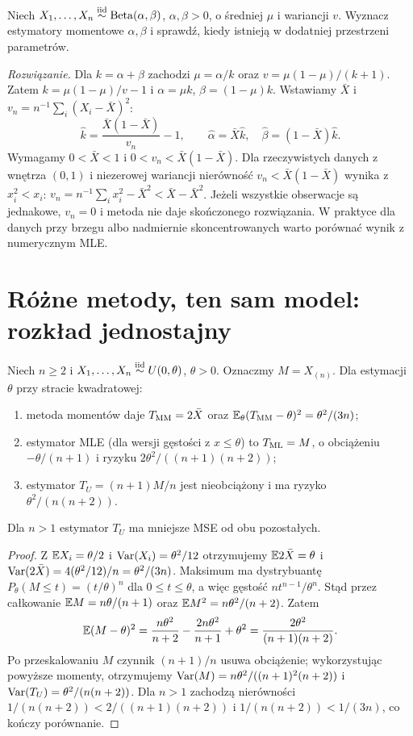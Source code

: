 \begin{zadanie}
\label{zad:beta-mom}
Niech $X_1,\ldots,X_n\mathrel{\overset{\mathrm{iid}}\sim}\operatorname{Beta}(\alpha,\beta)$,
$\alpha,\beta>0$, o średniej $\mu$ i wariancji $v$.
Wyznacz estymatory momentowe $\alpha,\beta$ i sprawdź,
kiedy istnieją w dodatniej przestrzeni parametrów.
\par\emph{Rozwiązanie.} Dla $k=\alpha+\beta$ zachodzi
$\mu=\alpha/k$ oraz $v=\mu(1-\mu)/(k+1)$. Zatem
$k=\mu(1-\mu)/v-1$ i $\alpha=\mu k$, $\beta=(1-\mu)k$.
Wstawiamy $\bar X$ i $v_n=n^{-1}\sum_i(X_i-\bar X)^2$:
\[
\widehat k=\frac{\bar X(1-\bar X)}{v_n}-1,\qquad
\widehat\alpha=\bar X\widehat k,\quad
\widehat\beta=(1-\bar X)\widehat k.
\]
Wymagamy $0<\bar X<1$ i $0<v_n<\bar X(1-\bar X)$.
Dla rzeczywistych danych z wnętrza $(0,1)$ i niezerowej wariancji
nierówność $v_n<\bar X(1-\bar X)$ wynika z $x_i^2<x_i$:
$v_n=n^{-1}\sum_i x_i^2-\bar X^2<\bar X-\bar X^2$.
Jeżeli wszystkie obserwacje są jednakowe, $v_n=0$ i metoda nie
daje skończonego rozwiązania. W praktyce dla danych przy brzegu
albo nadmiernie skoncentrowanych warto porównać wynik z numerycznym MLE.
\end{zadanie}

\section{Różne metody, ten sam model: rozkład jednostajny}
\begin{twierdzenie}
\label{thm:uniform-comparison}
Niech $n\ge2$ i $X_1,\ldots,X_n\mathrel{\overset{\mathrm{iid}}\sim} U(0,\theta)$, $\theta>0$.
Oznaczmy $M=X_{(n)}$. Dla estymacji $\theta$ przy stracie kwadratowej:
\begin{enumerate}
\item metoda momentów daje $T_{\rm MM}=2\bar X$ oraz
$\mathbb E_\theta(T_{\rm MM}-\theta)^2=\theta^2/(3n)$;
\item estymator MLE (dla wersji gęstości z $x\le\theta$) to
$T_{\rm ML}=M$, o obciążeniu $-\theta/(n+1)$ i ryzyku
$2\theta^2/((n+1)(n+2))$;
\item estymator $T_U=(n+1)M/n$ jest nieobciążony i ma ryzyko
$\theta^2/(n(n+2))$.
\end{enumerate}
Dla $n>1$ estymator $T_U$ ma mniejsze MSE od obu pozostałych.
\end{twierdzenie}
\begin{proof}
Z $\mathbb E X_i=\theta/2$ i $\operatorname{Var}(X_i)=\theta^2/12$
otrzymujemy $\mathbb E2\bar X=\theta$ i
$\operatorname{Var}(2\bar X)=4(\theta^2/12)/n=\theta^2/(3n)$.
Maksimum ma dystrybuantę $P_\theta(M\le t)=(t/\theta)^n$
dla $0\le t\le\theta$, a więc gęstość
$n t^{n-1}/\theta^n$. Stąd przez całkowanie
$\mathbb E M=n\theta/(n+1)$ oraz
$\mathbb E M^2=n\theta^2/(n+2)$. Zatem
\[
\mathbb E(M-\theta)^2=\frac{n\theta^2}{n+2}
-\frac{2n\theta^2}{n+1}+\theta^2
=\frac{2\theta^2}{(n+1)(n+2)}.
\]
Po przeskalowaniu $M$ czynnik $(n+1)/n$ usuwa obciążenie;
wykorzystując powyższe momenty, otrzymujemy
$\operatorname{Var}(M)=n\theta^2/((n+1)^2(n+2))$ i
$\operatorname{Var}(T_U)=\theta^2/(n(n+2))$.
Dla $n>1$ zachodzą nierówności
$1/(n(n+2))<2/((n+1)(n+2))$ i
$1/(n(n+2))<1/(3n)$, co kończy porównanie.
\end{proof}


